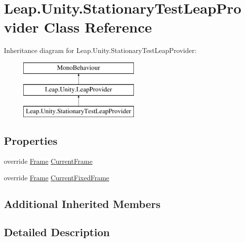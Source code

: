 \hypertarget{class_leap_1_1_unity_1_1_stationary_test_leap_provider}{}\section{Leap.\+Unity.\+Stationary\+Test\+Leap\+Provider Class Reference}
\label{class_leap_1_1_unity_1_1_stationary_test_leap_provider}
Inheritance diagram for Leap.\+Unity.\+Stationary\+Test\+Leap\+Provider\+:\begin{figure}[H]
\begin{center}
\leavevmode
\includegraphics[height=3.000000cm]{class_leap_1_1_unity_1_1_stationary_test_leap_provider}
\end{center}
\end{figure}
\subsection*{Properties}
\begin{DoxyCompactItemize}
\item 
override \mbox{\hyperlink{class_leap_1_1_frame}{Frame}} \mbox{\hyperlink{class_leap_1_1_unity_1_1_stationary_test_leap_provider_aee23993f910db116ba13a0a06efb4bef}{Current\+Frame}}
\item 
override \mbox{\hyperlink{class_leap_1_1_frame}{Frame}} \mbox{\hyperlink{class_leap_1_1_unity_1_1_stationary_test_leap_provider_ad14b3288247d8b694a35041f72789867}{Current\+Fixed\+Frame}}
\end{DoxyCompactItemize}
\subsection*{Additional Inherited Members}


\subsection{Detailed Description}


